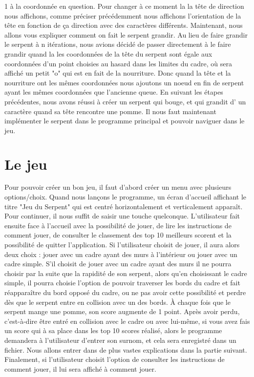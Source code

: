\documentclass[12pt]{article}
\begin{document}
1 à la coordonnée en question. Pour changer à ce moment la la tête de direction nous affichons, comme préciser précédemment nous affichons l'orientation de la tête en fonction de ça direction avec des caractères différents. Maintenant, nous allons vous expliquer comment on fait le serpent grandir. Au lieu de faire grandir le serpent à n itérations, nous avions décidé de passer directement à le faire grandir quand la les coordonnées de la tête du serpent sont égale aux coordonnées d'un point choisies au hasard dans les limites du cadre, où sera affiché un petit "o" qui est en fait de la nourriture. Donc quand la tête et la nourriture ont les mêmes coordonnées nous ajoutons un noeud en fin de serpent ayant les mêmes coordonnées que l'ancienne queue. En suivant les étapes précédentes, nous avons réussi à créer un serpent qui bouge, et qui grandit d’ un caractère quand sa tête rencontre une pomme. Il nous faut maintenant implémenter le serpent dans le programme principal et pouvoir naviguer dans le jeu.
\section{Le jeu}
Pour pouvoir créer un bon jeu, il faut d'abord créer un menu avec plusieurs options/choix. Quand nous lançons le programme, un écran d'accueil affichant le titre "Jeu du Serpent" qui est centré horizontalement et verticalement apparaît. Pour continuer, il nous suffit de saisir une touche quelconque. L'utilisateur fait ensuite face à l'accueil avec la possibilité de jouer, de lire les instructions de comment jouer, de consulter le classement des top 10 meilleurs scorent et la possibilité de quitter l'application. Si l'utilisateur choisit de jouer, il aura alors deux choix : jouer avec un cadre ayant des murs à l'intérieur ou jouer avec un cadre simple. S'il choisit de jouer avec un cadre ayant des murs il ne pourra choisir par la suite que la rapidité de son serpent, alors qu'en choisissant le cadre simple, il pourra choisie l'option de pouvoir traverser les bords du cadre et fait réapparaître du bord opposé du cadre, ou ne pas avoir cette possibilité et perdre dès que le serpent entre en collision avec un des bords. À chaque fois  que le serpent mange une pomme, son score augmente de 1 point. Après avoir perdu, c'est-à-dire être entré en collision avec le cadre ou avec lui-même, si vous avez fais un score qui à sa place dans les top 10 scores réalisé, alors le programme demandera à l'utilisateur d'entrer son surnom, et cela sera enregistré dans un fichier. Nous allons entrer dans de plus vastes explications dans la partie suivant. Finalement, si l'utilisateur choisit l'option de consulter les instructions de comment jouer, il lui sera affiché à comment jouer.
\end{document}
